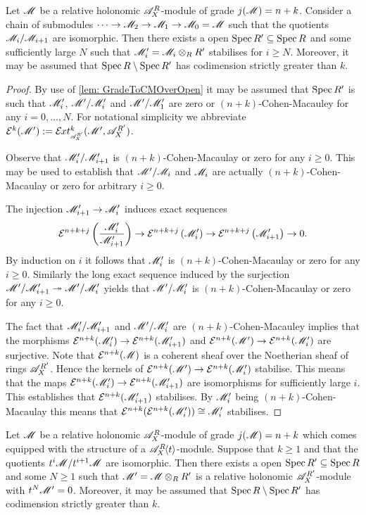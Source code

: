 \begin{lemma}\label{lem: StabilisationChains}
  Let $\mathscr{M}$ be a relative holonomic $\mathscr{A}_X^R$-module of grade $j(\mathscr{M}) = n+k$.
  Consider a chain of submodules $\cdots \to \mathscr{M}_2\to \mathscr{M}_1 \to \mathscr{M}_0 = \mathscr{M} $
  such that the quotients $\mathscr{M}_i/\mathscr{M}_{i+1}$ are isomorphic.
  Then there exists a open $\operatorname{Spec} R' \subseteq \operatorname{Spec} R$ and some sufficiently large $N$ such that $\mathscr{M}_i' = \mathscr{M}_i\otimes_R R'$ stabilises for $i\geq N$. Moreover, it may be assumed that $\operatorname{Spec} R \setminus \operatorname{Spec} R'$ has codimension strictly greater than $k$.
\end{lemma}
\begin{proof}
  By use of \cref{lem: GradeToCMOverOpen} it may be assumed that $\operatorname{Spec} R'$ is such that $\mathscr{M}_i'$, $\mathscr{M}'/\mathscr{M}_i'$ and $\mathscr{M}'/\mathscr{M}_1'$ are zero or $(n+k)$-Cohen-Macauley for any $i=0,\ldots,N$.
  For notational simplicity we abbreviate $\E^{k}(\M') :=\Ex{\A_X^{R'}}{k}(\M',\A_X^{R'})$.

  Observe that $ \mathscr{M}_i'/\mathscr{M}_{i+1}'$ is $(n+k)$-Cohen-Macaulay or zero for any $i\geq 0$.
  This may be used to establish that $\mathscr{M}'/\mathscr{M}_i$ and $\mathscr{M}_i$ are actually $(n+k)$-Cohen-Macaulay or zero for arbitrary $i\geq 0$.

  The injection $ \mathscr{M}_{i+1}'\to \mathscr{M}_i'$ induces exact sequences
  $$\mathcal{E}^{n+k+j}\left(\frac{\mathscr{M}_i'}{ \mathscr{M}_{i+1}'}\right) \to  \mathcal{E}^{n+k+j}\left(\mathscr{M}_i'\right) \to \mathcal{E}^{n+k +j}\left( \mathscr{M}_{i+1}'\right)\to 0.$$
  By induction on $i$ it follows that $\mathscr{M}_i'$ is $(n+k)$-Cohen-Macaulay or zero for any $i\geq 0$.
  Similarly the long exact sequence induced by the surjection $\mathscr{M}'/\mathscr{M}_{i+1}' \twoheadrightarrow \mathscr{M}'/\mathscr{M}_i'$ yields that $\mathscr{M}'/\mathscr{M}_i'$ is $(n+k)$-Cohen-Macaulay or zero for any $i\geq 0$.


  The fact that $\mathscr{M}_i'/\mathscr{M}_{i+1}'$ and $\mathscr{M}'/\mathscr{M}_{i}'$ are $(n+k)$-Cohen-Macauley implies that the morphisms $\mathcal{E}^{n+k}(\mathscr{M}_i') \to  \mathcal{E}^{n+k}(\mathscr{M}_{i+1}')$ and $\mathcal{E}^{n+k}(\mathscr{M}') \to \mathcal{E}^{n+k} (\mathscr{M}_i')$ are surjective.
  Note that $\mathcal{E}^{n+k}(\mathscr{M})$ is a coherent sheaf over the Noetherian sheaf of rings $\mathscr{A}_X^{R'}$.
  Hence the kernels of $\mathcal{E}^{n+k}(\mathscr{M}') \to \mathcal{E}^{n+k} (\mathscr{M}_i')$ stabilise.
  This means that the maps $\mathcal{E}^{n+k}(\mathscr{M}_i') \to  \mathcal{E}^{n+k}(\mathscr{M}_{i+1}')$ are isomorphisms for sufficiently large $i$.
  This establishes that $\mathcal{E}^{n+k}(\mathscr{M}_{i+1}')$ stabilises.
  By $ \mathscr{M}_i'$ being $(n+k)$-Cohen-Macaulay this means that $\mathcal{E}^{n+k}(\mathcal{E}^{n+k}(\mathscr{M}_i')) \cong \mathscr{M}_i'$ stabilises.
\end{proof}
\begin{lemma}\label{lem: StabilisationtN}
  Let $\mathscr{M}$ be a relative holonomic $\mathscr{A}_X^R$-module of grade $j(\mathscr{M}) = n+k$ which comes equipped with the structure of a $\mathscr{A}_X^R\mkern-5mu\left\langle t \right\rangle$-module. Suppose that $k\geq 1$ and that the quotients $t^i\mathscr{M}/ t^{i+1}\mathscr{M}$ are isomorphic.
  Then there exists a open $\operatorname{Spec} R' \subseteq \operatorname{Spec} R$ and some $N\geq 1$ such that $\mathscr{M}' = \mathscr{M} \otimes_{R} R'$ is a relative holonomic $\mathscr{A}_X^{R'}$-module with $t^N \mathscr{M}' = 0$.
  Moreover, it may be assumed that $\operatorname{Spec} R \setminus \operatorname{Spec} R'$ has codimension strictly greater than $k$.
\end{lemma}
